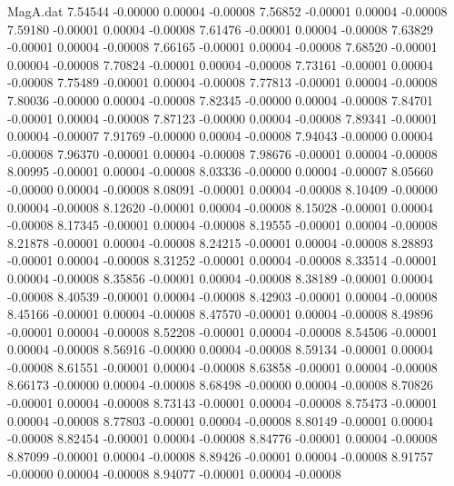 \begin{filecontents}{MagA.dat}
   7.54544   -0.00000    0.00004   -0.00008
   7.56852   -0.00001    0.00004   -0.00008
   7.59180   -0.00001    0.00004   -0.00008
   7.61476   -0.00001    0.00004   -0.00008
   7.63829   -0.00001    0.00004   -0.00008
   7.66165   -0.00001    0.00004   -0.00008
   7.68520   -0.00001    0.00004   -0.00008
   7.70824   -0.00001    0.00004   -0.00008
   7.73161   -0.00001    0.00004   -0.00008
   7.75489   -0.00001    0.00004   -0.00008
   7.77813   -0.00001    0.00004   -0.00008
   7.80036   -0.00000    0.00004   -0.00008
   7.82345   -0.00000    0.00004   -0.00008
   7.84701   -0.00001    0.00004   -0.00008
   7.87123   -0.00000    0.00004   -0.00008
   7.89341   -0.00001    0.00004   -0.00007
   7.91769   -0.00000    0.00004   -0.00008
   7.94043   -0.00000    0.00004   -0.00008
   7.96370   -0.00001    0.00004   -0.00008
   7.98676   -0.00001    0.00004   -0.00008
   8.00995   -0.00001    0.00004   -0.00008
   8.03336   -0.00000    0.00004   -0.00007
   8.05660   -0.00000    0.00004   -0.00008
   8.08091   -0.00001    0.00004   -0.00008
   8.10409   -0.00000    0.00004   -0.00008
   8.12620   -0.00001    0.00004   -0.00008
   8.15028   -0.00001    0.00004   -0.00008
   8.17345   -0.00001    0.00004   -0.00008
   8.19555   -0.00001    0.00004   -0.00008
   8.21878   -0.00001    0.00004   -0.00008
   8.24215   -0.00001    0.00004   -0.00008
   8.28893   -0.00001    0.00004   -0.00008
   8.31252   -0.00001    0.00004   -0.00008
   8.33514   -0.00001    0.00004   -0.00008
   8.35856   -0.00001    0.00004   -0.00008
   8.38189   -0.00001    0.00004   -0.00008
   8.40539   -0.00001    0.00004   -0.00008
   8.42903   -0.00001    0.00004   -0.00008
   8.45166   -0.00001    0.00004   -0.00008
   8.47570   -0.00001    0.00004   -0.00008
   8.49896   -0.00001    0.00004   -0.00008
   8.52208   -0.00001    0.00004   -0.00008
   8.54506   -0.00001    0.00004   -0.00008
   8.56916   -0.00000    0.00004   -0.00008
   8.59134   -0.00001    0.00004   -0.00008
   8.61551   -0.00001    0.00004   -0.00008
   8.63858   -0.00001    0.00004   -0.00008
   8.66173   -0.00000    0.00004   -0.00008
   8.68498   -0.00000    0.00004   -0.00008
   8.70826   -0.00001    0.00004   -0.00008
   8.73143   -0.00001    0.00004   -0.00008
   8.75473   -0.00001    0.00004   -0.00008
   8.77803   -0.00001    0.00004   -0.00008
   8.80149   -0.00001    0.00004   -0.00008
   8.82454   -0.00001    0.00004   -0.00008
   8.84776   -0.00001    0.00004   -0.00008
   8.87099   -0.00001    0.00004   -0.00008
   8.89426   -0.00001    0.00004   -0.00008
   8.91757   -0.00000    0.00004   -0.00008
   8.94077   -0.00001    0.00004   -0.00008

\end{filecontents}
